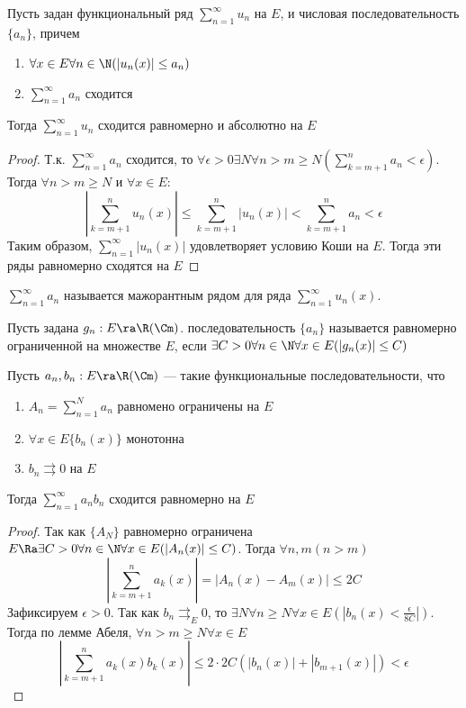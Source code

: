 
\begin{theorem}
    Пусть задан функциональный ряд \(\sum_{n = 1}^\infty u_n\) на \(E\), и числовая последовательность \(\{a_n\}\), причем
    \begin{enumerate}
        \item \(\forall x \in E \forall n \in \N (|u_n(x)| \le a_n)\)
        \item \(\sum_{n = 1}^\infty a_n\) сходится
    \end{enumerate}
    Тогда \(\sum_{n = 1}^\infty u_n\) сходится равномерно и абсолютно на \(E\)
\end{theorem}
\begin{proof}
    Т.к. \(\sum_{n = 1}^\infty a_n\) сходится, то \(\forall \epsilon > 0 \exists N \forall n > m \ge N \left(\sum_{k = m + 1}^n a_n < \epsilon\right)\). Тогда \(\forall n > m \ge N\) и \(\forall x \in E\):
    \[\left|\sum_{k = m + 1}^n u_n(x)\right| \le \sum_{k = m + 1}^n |u_n(x)| < \sum_{k = m + 1}^n a_n < \epsilon\]
    Таким образом, \(\sum_{n = 1}^\infty |u_n(x)|\) удовлетворяет условию Коши на \(E\). Тогда эти ряды равномерно сходятся на \(E\)
\end{proof}

\begin{note}
    \(\sum_{n = 1}^\infty a_n\) называется мажорантным рядом для ряда \(\sum_{n = 1}^\infty u_n(x)\).
\end{note}

\begin{definition}
    Пусть задана \(g_n: E \ra \R(\Cm)\). последовательность \(\{a_n\}\) называется равномерно ограниченной на множестве \(E\), если \(\exists C > 0 \forall n \in \N \forall x \in E (|g_n(x)| \le C)\)
\end{definition}
\begin{theorem}
    Пусть \(a_n, b_n: E \ra \R (\Cm)\) --- такие функциональные последовательности, что
    \begin{enumerate}
        \item \(A_n = \sum_{n = 1}^N a_n\) равномено ограничены на \(E\)
        \item \(\forall x \in E \{b_n(x)\}\) монотонна
        \item \(b_n \rightrightarrows 0\) на \(E\)
    \end{enumerate}
    Тогда \(\sum_{n = 1}^\infty a_nb_n\) сходится равномерно на \(E\)
\end{theorem}
\begin{proof}
    Так как \(\{A_N\}\) равномерно ограничена \(E \Ra \exists C > 0 \forall n \in \N \forall x \in E (|A_n(x)| \le C)\). Тогда \(\forall n, m (n > m)\)
    \[\left|\sum_{k = m + 1}^n a_k(x)\right| = \left|A_n(x) - A_m(x)\right| \le 2C\]
    Зафиксируем \(\epsilon > 0\). Так как \(b_n \rightrightarrows_E 0\), то \(\exists N \forall n \ge N \forall x \in E \left(\left|b_n(x) < \frac{\epsilon}{8C}\right|\right)\). Тогда по лемме Абеля, \(\forall n > m \ge N \forall x \in E\)
    \[\left|\sum_{k = m + 1}^n a_k(x)b_k(x)\right| \le 2\cdot2C \left(|b_n(x)| + |b_{m + 1}(x)|\right) < \epsilon\]
\end{proof}

